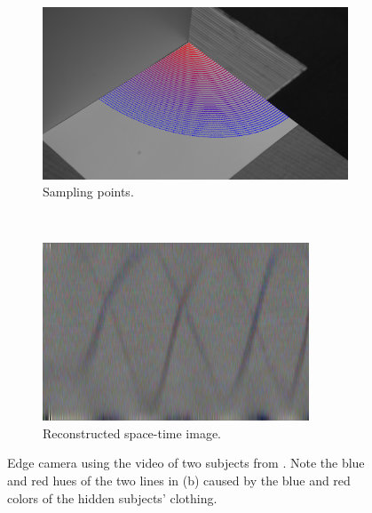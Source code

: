 \documentclass{article}
\begin{document}
\begin{figure}[htbp]
	\begin{subfigure}[t]{0.45\textwidth}
		\includegraphics[width=\textwidth]{img/2_people_samples.png}
		\caption{Sampling points.}
	\end{subfigure}
	~
	\begin{subfigure}[t]{0.45\textwidth}
		\includegraphics[width=\textwidth]{img/2_people_trace.png}
		\caption{Reconstructed space-time image.}
	\end{subfigure}
	\caption{Edge camera using the video of two subjects from \cite{bouman_turningcornerscameras2017}. Note the blue and red hues of the two lines in (b) caused by the blue and red colors of the hidden subjects' clothing.}
	\label{fig:2_people_samples}
\end{figure}
\end{document}
